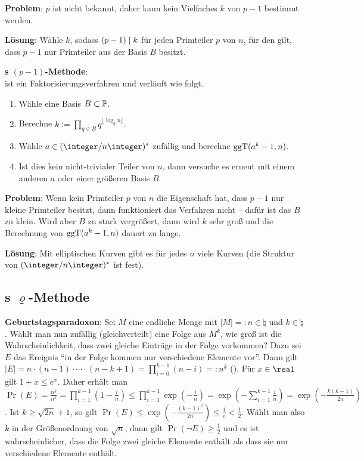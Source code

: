 \textbf{Problem}:
$p$ ist nicht bekannt, daher kann kein Vielfaches $k$ von $p - 1$ bestimmt werden.

\textbf{Lösung}:
Wähle $k$, sodass $(p - 1) \mid k$ für jeden Primteiler $p$ von $n$,
für den gilt, dass $p - 1$ nur Primteiler aus der Basis $B$ besitzt.

\linie

\textbf{s $(p-1)$-Methode}:\\
 ist ein Faktorisierungsverfahren und verläuft wie folgt.
\begin{enumerate}
    \item
    Wähle eine Basis $B \subset \mathbb{P}$.
    
    \item
    Berechne $k := \prod_{q \in B} q^{\lfloor \log_q n \rfloor}$.
    
    \item
    Wähle $a \in (\ZnZ)^\ast$ zufällig und berechne $\operatorname{ggT}(a^k - 1, n)$.
    
    \item
    Ist dies kein nicht-trivialer Teiler von $n$, dann versuche es erneut mit einem anderen
    $a$ oder einer größeren Basis $B$.
\end{enumerate}

\linie

\textbf{Problem}:
Wenn kein Primteiler $p$ von $n$ die Eigenschaft hat, dass $p - 1$ nur kleine Primteiler besitzt,
dann funktioniert das Verfahren nicht -- dafür ist das $B$ zu klein.
Wird aber $B$ zu stark vergrößert, dann wird $k$ sehr groß und die Berechnung von
$\operatorname{ggT}(a^k - 1, n)$ dauert zu lange.

\textbf{Lösung}:
Mit elliptischen Kurven gibt es für jedes $n$ viele Kurven
(die Struktur von $(\ZnZ)^\ast$ ist fest).

\pagebreak

\subsection{%
    s \texorpdfstring{$\varrho$}{ρ}-Methode%
}

\textbf{Geburtstagsparadoxon}:
Sei $M$ eine endliche Menge mit $|M| =: n \in \natural$ und $k \in \natural$.
Wählt man nun zufällig (gleichverteilt) eine Folge aus $M^k$,
wie groß ist die Wahrscheinlichkeit, dass zwei
gleiche Einträge in der Folge vorkommen?
Dazu sei $E$ das Ereignis "`in der Folge kommen nur verschiedene Elemente vor"'.
Dann gilt
$|E| = n \cdot (n - 1) \cdot \dotsb \cdot (n - k + 1) = \prod_{i=0}^{k-1} (n-i) =:
n^{\underline{k}}$
().
Für $x \in \real$ gilt $1 + x \le e^x$.
Daher erhält man\\
$\Pr(E) = \frac{n^{\underline{k}}}{n^k} = \prod_{i=1}^{k-1} (1 - \frac{i}{n})
\le \prod_{i=1}^{k-1} \exp(-\frac{i}{n}) = \exp(-\sum_{i=1}^{k-1} \frac{i}{n})
= \exp(-\frac{k(k-1)}{2n})$.
Ist $k \ge \sqrt{2n} + 1$, so gilt
$\Pr(E) \le \exp(-\frac{(k-1)^2}{2n}) \le \frac{1}{e} < \frac{1}{2}$.
Wählt man also $k$ in der Größenordnung von $\sqrt{n}$, dann gilt
$\Pr(\lnot E) \ge \frac{1}{2}$ und es ist wahrscheinlicher, dass die Folge zwei gleiche
Elemente enthält als dass sie nur verschiedene Elemente enthält.

